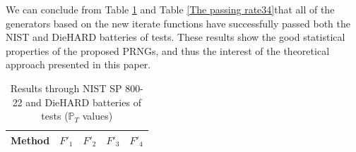 We can conclude from Table \ref{The passing rate12} and Table \ref{The passing rate34}that all of the generators based on the new iterate functions have successfully passed both the NIST and DieHARD batteries of tests. 
These results show the good statistical properties of the proposed PRNGs, and thus the interest of the theoretical approach presented in this paper.

\begin{table}[t]
\renewcommand{\arraystretch}{1.3}
\caption{Results through NIST SP 800-22 and DieHARD batteries of tests ($\mathbb{P}_T$ values)}
\label{The passing rate12}
\centering
  \begin{tabular}{|l@{}||c@{}|c@{}|c@{}|c@{}|}
    \hline
Method & $F'_1$ &  $F'_2$ & $F'_3$ & $F'_4$ \\ \hline\hline



\end{tabular}
\end{table}
